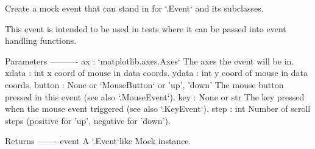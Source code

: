 \begin{DoxyVerb}Create a mock event that can stand in for `.Event` and its subclasses.

This event is intended to be used in tests where it can be passed into
event handling functions.

Parameters
----------
ax : `matplotlib.axes.Axes`
    The axes the event will be in.
xdata : int
    x coord of mouse in data coords.
ydata : int
    y coord of mouse in data coords.
button : None or `MouseButton` or {'up', 'down'}
    The mouse button pressed in this event (see also `.MouseEvent`).
key : None or str
    The key pressed when the mouse event triggered (see also `.KeyEvent`).
step : int
    Number of scroll steps (positive for 'up', negative for 'down').

Returns
-------
event
    A `.Event`\-like Mock instance.
\end{DoxyVerb}
 